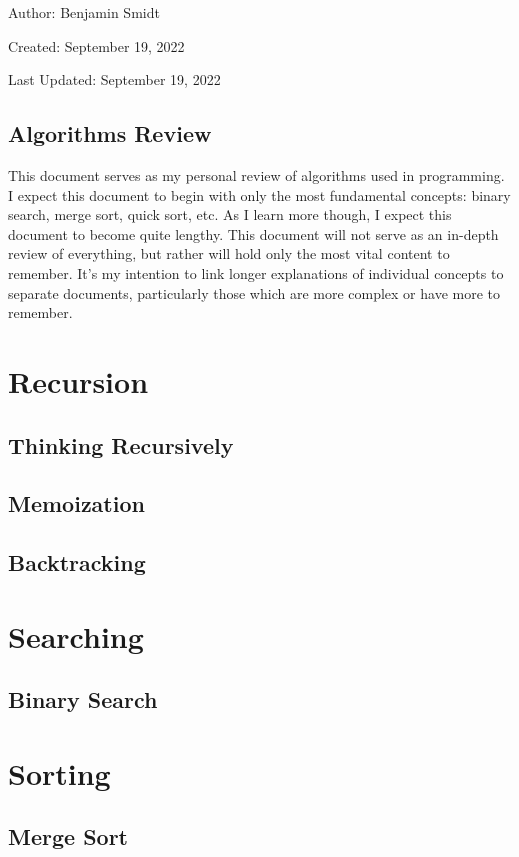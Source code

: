 \documentclass[12pt]{article}
\begin{document}
\noindent Author: Benjamin Smidt

\noindent Created: September 19, 2022

\noindent Last Updated: September 19, 2022
\begin{center}
\section*{Algorithms Review}
\end{center}

\noindent This document serves as my personal review of algorithms used in programming. 
I expect this document to begin with only the most fundamental concepts: binary search, merge sort, 
quick sort, etc. As I learn more though, I expect this document to become quite lengthy. This 
document will not serve as an in-depth review of everything, but rather will hold only the most vital content
to remember. It's my intention to link longer explanations of individual concepts to separate documents, 
particularly those which are more complex or have more to remember. 

\tableofcontents{}

\section{Recursion}
\subsection{Thinking Recursively}
\subsection{Memoization}
\subsection{Backtracking}


\section{Searching}
\subsection{Binary Search}


\section{Sorting}
\subsection{Merge Sort}
\end{document}
